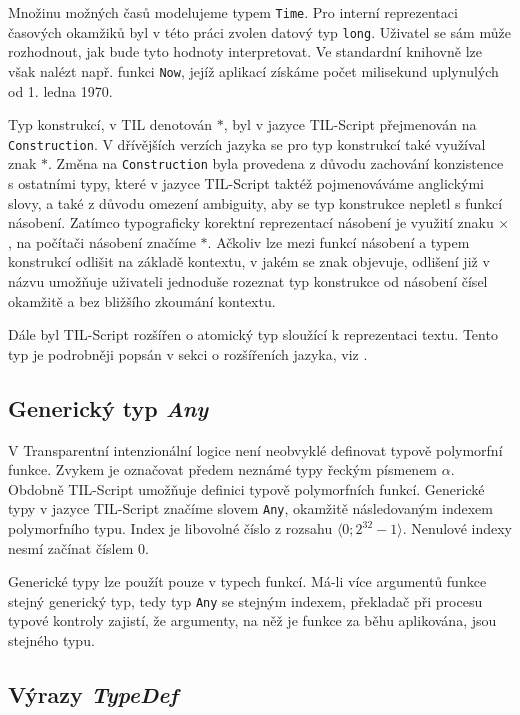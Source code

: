 Množinu možných časů modelujeme typem \lstinline{Time}. Pro interní reprezentaci časových okamžiků
byl v této práci zvolen datový typ \lstinline{long}. Uživatel se sám může rozhodnout, jak bude tyto
hodnoty interpretovat. Ve standardní knihovně lze však nalézt např. funkci \lstinline{Now}, jejíž
aplikací získáme počet milisekund uplynulých od 1. ledna 1970.

Typ konstrukcí, v TIL denotován $*$, byl v jazyce TIL-Script přejmenován
na \lstinline{Construction}. V dřívějších verzích jazyka se pro typ konstrukcí také využíval znak
$*$. Změna na \lstinline{Construction} byla provedena z důvodu zachování konzistence s ostatními
typy, které v jazyce TIL-Script taktéž pojmenováváme anglickými slovy, a také z důvodu omezení
ambiguity, aby se typ konstrukce nepletl s funkcí násobení. Zatímco typograficky korektní
reprezentací násobení je využití znaku $\times$, na počítači násobení značíme $*$. Ačkoliv lze mezi
funkcí násobení a typem konstrukcí odlišit na základě kontextu, v jakém se znak objevuje, odlišení
již v názvu umožňuje uživateli jednoduše rozeznat typ konstrukce od násobení čísel okamžitě a
bez bližšího zkoumání kontextu.

Dále byl TIL-Script rozšířen o atomický typ sloužící k reprezentaci textu. Tento typ je podrobněji
popsán v sekci o rozšířeních jazyka, viz .

\subsection{Generický typ \textit{Any}}

V Transparentní intenzionální logice není neobvyklé definovat typově polymorfní funkce. Zvykem je
označovat předem neznámé typy řeckým písmenem $\alpha$. Obdobně TIL-Script umožňuje definici
typově polymorfních funkcí. Generické typy v jazyce TIL-Script značíme slovem \lstinline{Any},
okamžitě následovaným indexem polymorfního typu. Index je libovolné číslo z rozsahu
$\bigl \langle 0; 2^{32}-1 \bigr \rangle$. Nenulové indexy nesmí začínat číslem 0.

Generické typy lze použít pouze v typech funkcí. Má-li více argumentů funkce stejný generický
typ, tedy typ \lstinline{Any} se stejným indexem, překladač při procesu typové kontroly zajistí,
že argumenty, na něž je funkce za běhu aplikována, jsou stejného typu.

\subsection{Výrazy \textit{TypeDef}}

